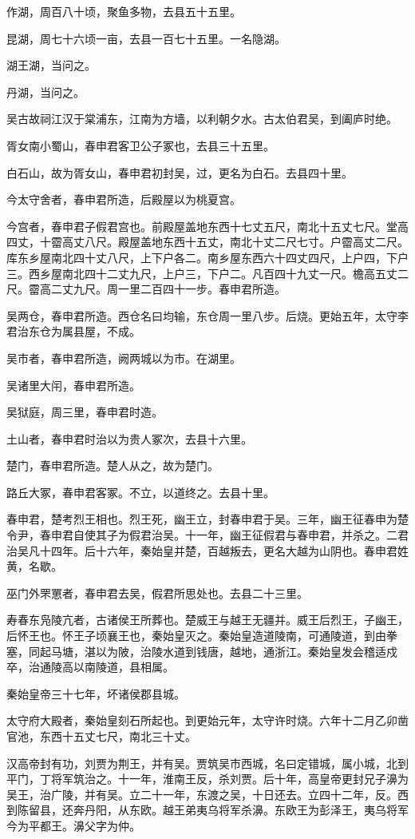 \documentclass[12pt,UTF8]{ctexbook}
\begin{document}
作湖，周百八十顷，聚鱼多物，去县五十五里。

昆湖，周七十六顷一亩，去县一百七十五里。一名隐湖。

湖王湖，当问之。

丹湖，当问之。

吴古故祠江汉于棠浦东，江南为方墙，以利朝夕水。古太伯君吴，到阖庐时绝。

胥女南小蜀山，春申君客卫公子冢也，去县三十五里。

白石山，故为胥女山，春申君初封吴，过，更名为白石。去县四十里。

今太守舍者，春申君所造，后殿屋以为桃夏宫。

今宫者，春申君子假君宫也。前殿屋盖地东西十七丈五尺，南北十五丈七尺。堂高四丈，十霤高丈八尺。殿屋盖地东西十五丈，南北十丈二尺七寸。户霤高丈二尺。库东乡屋南北四十丈八尺，上下户各二。南乡屋东西六十四丈四尺，上户四，下户三。西乡屋南北四十二丈九尺，上户三，下户二。凡百四十九丈一尺。檐高五丈二尺。霤高二丈九尺。周一里二百四十一步。春申君所造。

吴两仓，春申君所造。西仓名曰均输，东仓周一里八步。后烧。更始五年，太守李君治东仓为属县屋，不成。

吴市者，春申君所造，阙两城以为市。在湖里。

吴诸里大闬，春申君所造。

吴狱庭，周三里，春申君时造。

土山者，春申君时治以为贵人冢次，去县十六里。

楚门，春申君所造。楚人从之，故为楚门。

路丘大冢，春申君客冢。不立，以道终之。去县十里。

春申君，楚考烈王相也。烈王死，幽王立，封春申君于吴。三年，幽王征春申为楚令尹，春申君自使其子为假君治吴。十一年，幽王征假君与春申君，并杀之。二君治吴凡十四年。后十六年，秦始皇并楚，百越叛去，更名大越为山阴也。春申君姓黄，名歇。

巫门外罘罳者，春申君去吴，假君所思处也。去县二十三里。

寿春东凫陵亢者，古诸侯王所葬也。楚威王与越王无疆并。威王后烈王，子幽王，后怀王也。怀王子顷襄王也，秦始皇灭之。秦始皇造道陵南，可通陵道，到由拳塞，同起马塘，湛以为陂，治陵水道到钱唐，越地，通浙江。秦始皇发会稽适戍卒，治通陵高以南陵道，县相属。

秦始皇帝三十七年，坏诸侯郡县城。

太守府大殿者，秦始皇刻石所起也。到更始元年，太守许时烧。六年十二月乙卯凿官池，东西十五丈七尺，南北三十丈。

汉高帝封有功，刘贾为荆王，并有吴。贾筑吴市西城，名曰定错城，属小城，北到平门，丁将军筑治之。十一年，淮南王反，杀刘贾。后十年，高皇帝更封兄子濞为吴王，治广陵，并有吴。立二十一年，东渡之吴，十日还去。立四十二年，反。西到陈留县，还奔丹阳，从东欧。越王弟夷乌将军杀濞。东欧王为彭泽王，夷乌将军今为平都王。濞父字为仲。
\end{document}
